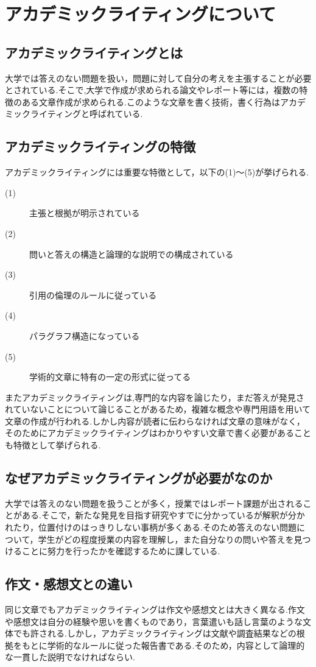 \documentclass[a4j,12pt]{jarticle}
\begin{document}
\section{アカデミックライティングについて}
\subsection{アカデミックライティングとは}
大学では答えのない問題を扱い，問題に対して自分の考えを主張することが必要とされている.そこで,大学で作成が求められる論文やレポート等には，複数の特徴のある文章作成が求められる.このような文章を書く技術，書く行為はアカデミックライティングと呼ばれている\cite{ren2}.
\subsection{アカデミックライティングの特徴}
アカデミックライティングには重要な特徴として，以下の(1)〜(5)が挙げられる.
\begin{description}
  \item[(1)] 主張と根拠が明示されている
  \item[(2)] 問いと答えの構造と論理的な説明での構成されている
  \item[(3)] 引用の倫理のルールに従っている
  \item[(4)] パラグラフ構造になっている
  \item[(5)] 学術的文章に特有の一定の形式に従ってる
 \end{description}
 またアカデミックライティングは,専門的な内容を論じたり，まだ答えが発見されていないことについて論じることがあるため，複雑な概念や専門用語を用いて文章の作成が行われる.しかし内容が読者に伝わらなければ文章の意味がなく，そのためにアカデミックライティングはわかりやすい文章で書く必要があることも特徴として挙げられる\cite{ren7}.
 
\newpage
\subsection{なぜアカデミックライティングが必要がなのか}
大学では答えのない問題を扱うことが多く，授業ではレポート課題が出されることがある.そこで，新たな発見を目指す研究やすでに分かっているが解釈が分かれたり，位置付けのはっきりしない事柄が多くある.そのため答えのない問題について，学生がどの程度授業の内容を理解し，また自分なりの問いや答えを見つけることに努力を行ったかを確認するために課している.

\subsection{作文・感想文との違い}
同じ文章でもアカデミックライティングは作文や感想文とは大きく異なる.作文や感想文は自分の経験や思いを書くものであり，言葉遣いも話し言葉のような文体でも許される.しかし，アカデミックライティングは文献や調査結果などの根拠をもとに学術的なルールに従った報告書である.そのため，内容として論理的な一貫した説明でなければならい.
\end{document}
